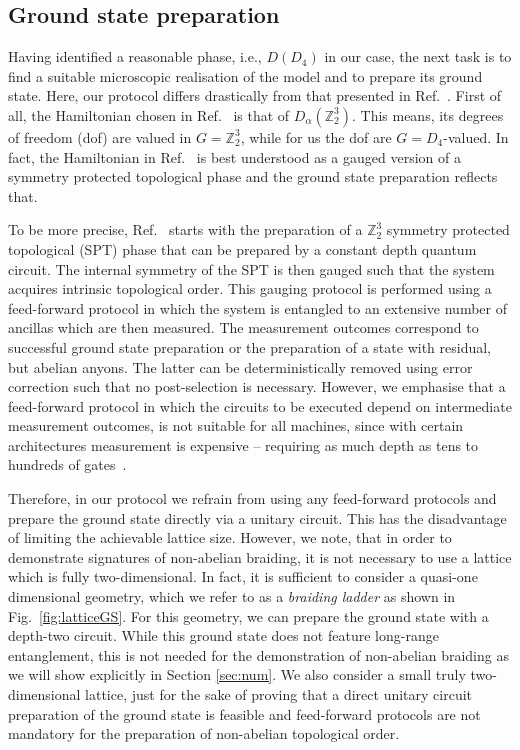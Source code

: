 \documentclass[a4paper,twocolumn,11pt, accepted=2024-06-14]{quantumarticle}
\begin{document}
\subsection{Ground state preparation}
Having identified a reasonable phase, i.e., $D(D_4)$ in our case, the next task is to find a suitable microscopic realisation of the model and to prepare its ground state. Here, our protocol differs drastically from that presented in Ref.~\cite{iqbal2023creation}. First of all, the Hamiltonian chosen in Ref.~\cite{iqbal2023creation} is that of $D_\alpha(\mathbb Z_2^3)$. This means, its degrees of freedom (dof) are valued in $G=\mathbb Z_2^3$, while for us the dof are $G=D_4$-valued. In fact, the Hamiltonian in Ref.~\cite{iqbal2023creation} is best understood as a gauged version of a symmetry protected topological phase and the ground state preparation reflects that. 

To be more precise, Ref.~\cite{iqbal2023creation} starts with the preparation of a $\mathbb Z_2^3$ symmetry protected topological (SPT) phase that can be prepared by a constant depth quantum circuit. The internal symmetry of the SPT is then gauged such that the system acquires intrinsic topological order. This gauging protocol is performed using a feed-forward protocol in which the system is entangled to an extensive number of ancillas which are then measured. The measurement outcomes correspond to successful ground state preparation or the preparation of a state with residual, but abelian anyons. The latter can be deterministically removed using error correction such that no post-selection is necessary. However, we emphasise that a feed-forward protocol in which the circuits to be executed depend on intermediate measurement outcomes, is not suitable for all machines, since with certain architectures measurement is expensive -- requiring as much depth as tens to hundreds of gates~\cite{weber}.

Therefore, in our protocol we refrain from using any feed-forward protocols and prepare the ground state directly via a unitary circuit. This has the disadvantage of limiting the achievable lattice size. However, we note, that in order to demonstrate signatures of non-abelian braiding, it is not necessary to use a lattice which is fully two-dimensional. In fact, it is sufficient to consider a quasi-one dimensional geometry, which we refer to as a \emph{braiding ladder} as shown in Fig.~\ref{fig:latticeGS}. For this geometry, we can prepare the ground state with a depth-two circuit. While this ground state does not feature long-range entanglement, this is not needed for the demonstration of non-abelian braiding as we will show explicitly in Section \ref{sec:num}. We also consider a small truly two-dimensional lattice, just for the sake of proving that a direct unitary circuit preparation of the ground state is feasible and feed-forward protocols are not mandatory for the preparation of non-abelian topological order.
\end{document}
